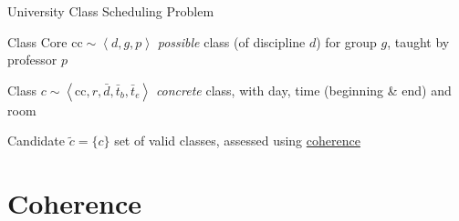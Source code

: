 \documentclass{beamer}
\providecommand{\rootdir}{../doc}
\newcommand{\resizeinput}[2][1]{%
  \resizebox{#1\textwidth}{!}{}%
}
\begin{document}
\begin{frame}{University Class Scheduling Problem}
  \begin{block}{Class Core $\mathrm{cc} \sim \left< d, g, p \right>$}
    \emph{possible} class (of discipline $d$) for group $g$,
    taught by professor $p$
  \end{block}
  \begin{block}{Class $ c \sim \left< \mathrm{cc}, r, \bar d, \bar t_b, \bar t_e \right> $}
    \emph{concrete} class, with day, time (beginning \& end) and room
  \end{block}
  \begin{block}{Candidate $\tilde{c}=\{c\}$}
    set of \alert{valid} classes, assessed using \underline{coherence}
  \end{block}
\end{frame}

\frame{
  \trimbox{30pt 0 0 0}{
    \resizeinput{\rootdir/img/ConnectionMatrix/Candidates-content.tikz}
  }
}

\section{Coherence}
\end{document}
